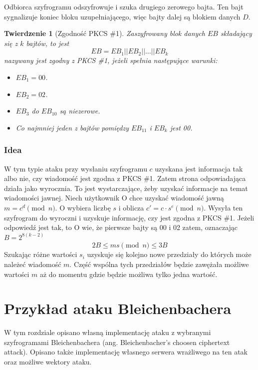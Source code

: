 \documentclass[12pt,twoside,a4]{mwbk}
\newtheorem{twierdzenie}{Twierdzenie}[chapter]
\theoremstyle{definition}
\begin{document}
Odbiorca szyfrogramu odszyfrowuje i szuka drugiego zerowego bajta. Ten bajt sygnalizuje koniec bloku uzupełniającego, więc bajty dalej są blokiem danych $D$.

\begin{twierdzenie}[Zgodność PKCS \#1]
Zaszyfrowany blok danych $EB$ składający się z $k$ bajtów, to jest 
\[ EB = EB_1||EB_2||\ldots||EB_k \]
nazywany jest zgodny z PKCS \#1, jeżeli spełnia następujące warunki:
\begin{itemize}
\item $EB_1 = 00$.
\item $EB_2 = 02$.
\item $EB_3$ do $EB_{10}$ są niezerowe.
\item Co najmniej jeden z bajtów pomiędzy $EB_{11}$ i $EB_k$ jest 00. 
\end{itemize}
\end{twierdzenie}

\subsection{Idea \cite{robot}}
W tym typie ataku przy wysłaniu szyfrogramu $c$ uzyskana jest informacja tak albo nie, czy wiadomość jest zgodna z PKCS \#1. Zatem strona odpowiadająca działa jako wyrocznia. To jest wystarczające, żeby uzyskać informacje na temat wiadomości jawnej. Niech użytkownik O chce uzyskać wiadomość jawną\linebreak$m = c^d \pmod n$.
O wybiera liczbę $s$ i oblicza $c' = c \cdot s^e \pmod n$. Wysyła ten szyfrogram do wyroczni i uzyskuje informację, czy jest zgodna z PKCS \#1. Jeżeli odpowiedź jest tak, to O wie, że pierwsze bajty są 00 i 02 zatem, oznaczając $B = 2^{8(k-2)}$
\[ 2B \leq ms \pmod n \leq 3B \]
Szukając różne wartości $s_i$ uzyskuje się kolejno nowe przedziały do których może należeć wiadomość $m$. Część wspólna tych przedziałów będzie zawężała możliwe wartości $m$ aż do momentu gdzie będzie możliwa tylko jedna wartość.




\chapter{Przykład ataku Bleichenbachera}
W tym rozdziale opisano własną implementację ataku z wybranymi szyfrogramami Bleichenbachera (ang. Bleichenbacher's choosen ciphertext attack). Opisano także implementację własnego serwera wrażliwego na ten atak oraz możliwe wektory ataku.
\end{document}
